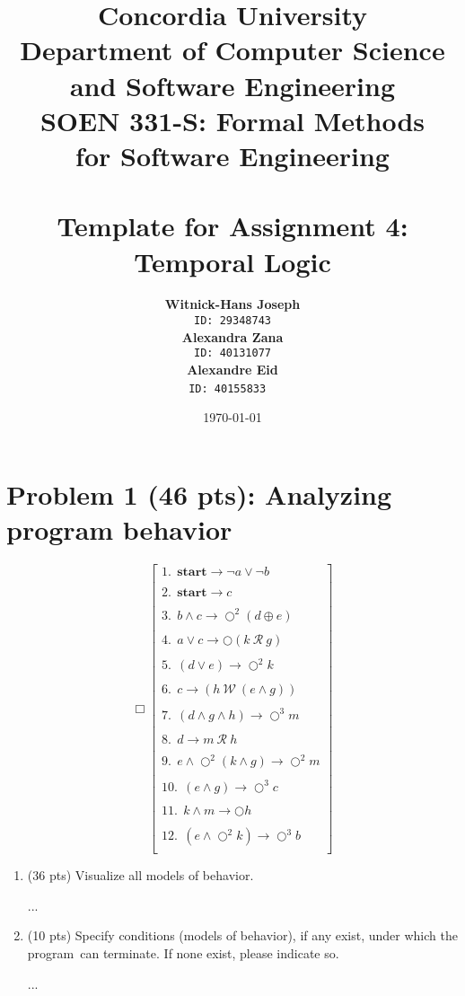 \documentclass[12pt]{article}
\title{Concordia University\\
Department of Computer Science and Software Engineering\\
\textbf{SOEN 331-S: Formal Methods\\for Software Engineering}\\
\ \\
\textbf{Template for Assignment 4:\\Temporal Logic}}
\author{\textbf{Witnick-Hans Joseph}\\
		\texttt{ID: 29348743}\\
		\textbf{Alexandra Zana}\\
		\texttt{ID: 40131077}\\
		\textbf{Alexandre Eid}\\
		\texttt{ID: 40155833}
\ \\}
\date{\today}
\begin{document}
\maketitle

\newpage

\section{Problem 1 (46 pts): Analyzing program behavior}

\[
\Box	\begin{bmatrix}

		1.~~   \textbf{start} \rightarrow \neg a \vee \neg b  \\
\ \\
      	2.~~   \textbf{start} \rightarrow c\\
\ \\    
      	3.~~   b \wedge c \rightarrow \bigcirc^{2} (d \oplus e)\\
\ \\    
      	4.~~   a \vee c \rightarrow \bigcirc (k~\mathcal{R}~g)\\
\ \\    
      	5.~~   (d \vee e) \rightarrow \bigcirc^{2} k\\
\ \\    
      	6.~~   c \rightarrow (h ~\mathcal{W}~ (e \wedge g))\\
\ \\    
      	7.~~   (d \wedge g \wedge h) \rightarrow \bigcirc^{3} m\\
\ \\
		8.~~   d \rightarrow m~\mathcal{R}~h \\
\ \\
		9.~~   e \wedge \bigcirc^{2} (k \wedge g) \rightarrow \bigcirc^{2}m \\
\ \\
		10.~~  (e \wedge g) \rightarrow \bigcirc^{3} c\\
\ \\
		11.~~  k \wedge m \rightarrow \bigcirc h\\
\ \\
		12.~~  (e \wedge \bigcirc^{2}k) \rightarrow \bigcirc^{3}b \\
					
		\end{bmatrix}
\]

\begin{enumerate}

	\item (36 pts) Visualize all models of behavior.

	
	\noindent ...

	\item (10 pts) Specify conditions (models of behavior), if any exist, under which the program\
	can terminate. If none exist, please indicate so.
		
	\noindent ...
		
				
	
\end{enumerate}
\end{document}
